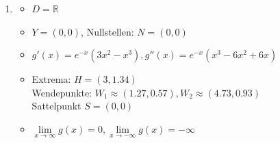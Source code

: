 \begin{enumerate}
\begin{enumerate}
\begin{itemize}
                        \item $\lim\limits_{x \to \infty} f(x) = \infty, \lim\limits_{x \to -\infty} f(x) = -\infty$
                    \end{itemize}
              \item \begin{itemize}
                        \item  $D = \mathbb{R}$
                        \item $Y = (0, 0)$, Nullstellen: $N = (0,0)$
                        \item $g'(x) = e^{-x} (3x^2-x^3), g''(x) = e^{-x} (x^3-6x^2+6x)$
                        \item Extrema: $ H=(3, 1.34)$ \\
                              Wendepunkte: $W_1 \approx (1.27, 0.57), W_2 \approx(4.73, 0.93)$ \\
                              Sattelpunkt $S=(0,0)$
                        \item $\lim\limits_{x \to \infty} g(x) =0, \lim\limits_{x \to -\infty} g(x) = -\infty$
                    \end{itemize}
          \end{enumerate}


\end{enumerate}